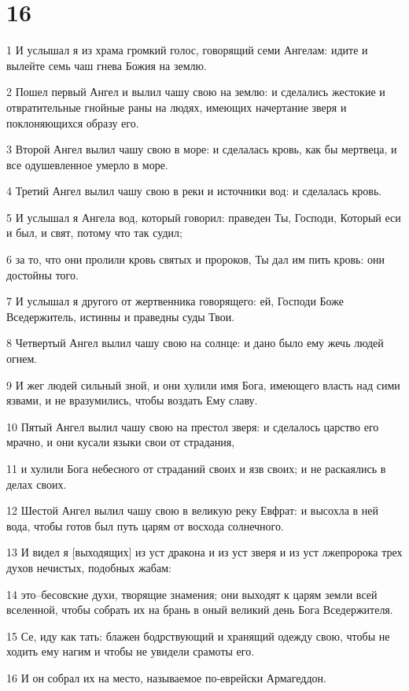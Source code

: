 \chapter{16}

\par 1 И услышал я из храма громкий голос, говорящий семи Ангелам: идите и вылейте семь чаш гнева Божия на землю.
\par 2 Пошел первый Ангел и вылил чашу свою на землю: и сделались жестокие и отвратительные гнойные раны на людях, имеющих начертание зверя и поклоняющихся образу его.
\par 3 Второй Ангел вылил чашу свою в море: и сделалась кровь, как бы мертвеца, и все одушевленное умерло в море.
\par 4 Третий Ангел вылил чашу свою в реки и источники вод: и сделалась кровь.
\par 5 И услышал я Ангела вод, который говорил: праведен Ты, Господи, Который еси и был, и свят, потому что так судил;
\par 6 за то, что они пролили кровь святых и пророков, Ты дал им пить кровь: они достойны того.
\par 7 И услышал я другого от жертвенника говорящего: ей, Господи Боже Вседержитель, истинны и праведны суды Твои.
\par 8 Четвертый Ангел вылил чашу свою на солнце: и дано было ему жечь людей огнем.
\par 9 И жег людей сильный зной, и они хулили имя Бога, имеющего власть над сими язвами, и не вразумились, чтобы воздать Ему славу.
\par 10 Пятый Ангел вылил чашу свою на престол зверя: и сделалось царство его мрачно, и они кусали языки свои от страдания,
\par 11 и хулили Бога небесного от страданий своих и язв своих; и не раскаялись в делах своих.
\par 12 Шестой Ангел вылил чашу свою в великую реку Евфрат: и высохла в ней вода, чтобы готов был путь царям от восхода солнечного.
\par 13 И видел я [выходящих] из уст дракона и из уст зверя и из уст лжепророка трех духов нечистых, подобных жабам:
\par 14 это--бесовские духи, творящие знамения; они выходят к царям земли всей вселенной, чтобы собрать их на брань в оный великий день Бога Вседержителя.
\par 15 Се, иду как тать: блажен бодрствующий и хранящий одежду свою, чтобы не ходить ему нагим и чтобы не увидели срамоты его.
\par 16 И он собрал их на место, называемое по-еврейски Армагеддон.
